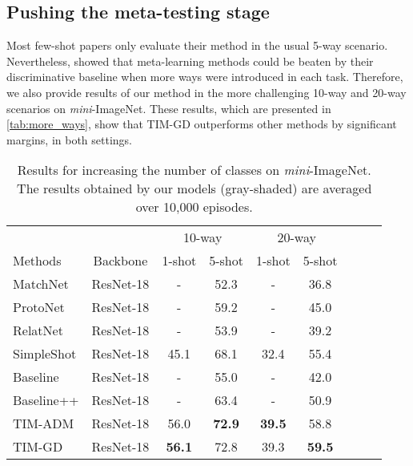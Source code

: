 \documentclass{article}
\begin{document}
    \subsection{Pushing the meta-testing stage}
        
        Most few-shot papers only evaluate their method in the usual 5-way scenario. Nevertheless, \cite{closer_look} showed that meta-learning methods could be beaten by their discriminative baseline when more ways were introduced in each task. Therefore, we also provide results of our method in the more challenging 10-way and 20-way scenarios on \textit{mini}-ImageNet. These results, which are presented in \autoref{tab:more_ways}, show that TIM-GD outperforms other methods by significant margins, in both settings.
        \begin{table}
            \centering
            \caption{Results for increasing the number of classes on \textit{mini}-ImageNet. The results obtained by our models (gray-shaded) are averaged over 10,000 episodes.}
            \small
            \begin{tabular}{lcccccccc}
                & & \multicolumn{2}{c}{10-way} & \multicolumn{2}{c}{20-way} \\
                 Methods & Backbone & 1-shot & 5-shot & 1-shot & 5-shot\\
                 \toprule
                 MatchNet \cite{matching_net}& ResNet-18 & - & 52.3 & - & 36.8 \\
                 ProtoNet \cite{prototypical_nets}& ResNet-18 & - & 59.2 & - & 45.0 \\
                 RelatNet \cite{relation_net}& ResNet-18 & - & 53.9 & - & 39.2 \\
                 SimpleShot \cite{simpleshot}& ResNet-18 & 45.1 & 68.1 & 32.4 & 55.4 \\
                 Baseline \cite{closer_look}& ResNet-18 & - & 55.0 & - & 42.0 \\
                 Baseline++ \cite{closer_look}& ResNet-18 & - & 63.4 & - & 50.9 \\
                 \rowcolor{Gray} TIM-ADM & ResNet-18 & 56.0 & \textbf{72.9} & \textbf{39.5} & 58.8 \\
                 \rowcolor{Gray} TIM-GD & ResNet-18 & \textbf{56.1} & 72.8 & 39.3 & \textbf{59.5} \\
                 \bottomrule
            \end{tabular}
            \label{tab:more_ways}
        \end{table}
\end{document}
